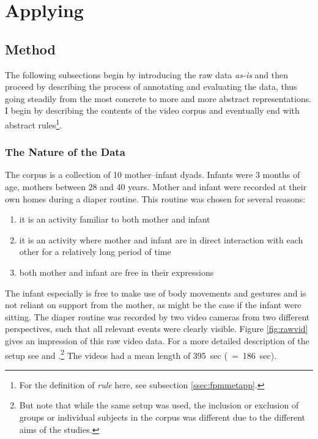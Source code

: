 
\chapter{Applying \fpmupper}
\label{ch:fpm}

\section{Method}
\label{sec:fpmmet}
The following subsections begin by introducing the raw data \emph{as-is} and then proceed by describing the process of annotating and evaluating the data, thus going steadily from the most concrete to more and more abstract representations.
I begin by describing the contents of the video corpus and eventually end with abstract rules\footnote{For the definition of \emph{rule} here, see subsection \ref{ssec:fpmmetapp}.}.

\subsection{The Nature of the Data}
\label{ssec:fpmmetnat}
The corpus is a collection of 10 mother--infant dyads.
Infants were 3 months of age, mothers between 28 and 40 years.
Mother and infant were recorded at their own homes during a diaper routine.
This routine was chosen for several reasons:
\begin{enumerate}[label={\alph*)}]
	\item it is an activity familiar to both mother and infant
	\item it is an activity where mother and infant are in direct interaction with each other for a relatively long period of time
	\item both mother and infant are free in their expressions
\end{enumerate}
The infant especially is free to make use of body movements and gestures and is not reliant on support from the mother, as might be the case if the infant were sitting.
The diaper routine was recorded by two video cameras from two different perspectives, such that all relevant events were clearly visible.
Figure \ref{fig:rawvid} gives an impression of this raw video data.
For a more detailed description of the setup see \citet[]{nomikou_verbs_2017} and \citet[]{nomikou_language_2011}.\footnote{But note that while the same setup was used, the inclusion or exclusion of groups or individual subjects in the corpus was different due to the different aims of the studies.} The videos had a mean length of 395~sec (\sd~=~186~sec).



